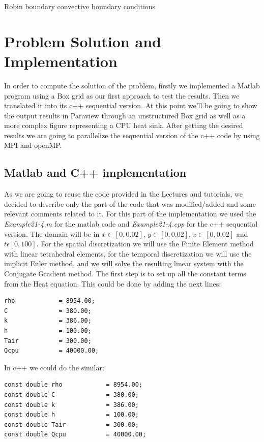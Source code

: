 \documentclass[12pt]{article}
\begin{document}
Robin boundary convective boundary conditions

\section{Problem Solution and Implementation}

In order to compute the solution of the problem, firstly we implemented a Matlab program using a Box grid as our first approach to test the results. Then we translated it into its c++ sequential version. At this point we'll be going to show the output results in Paraview through an unstructured Box grid as well as a more complex figure representing a CPU heat sink. After getting the desired results we are going to parallelize the sequential version of the c++ code by using MPI and openMP.

\subsection{Matlab and C++ implementation}
As we are going to reuse the code provided in the Lectures and tutorials, we decided to describe only the part of the code that was modified/added and some relevant comments related to it. For this part of the implementation we used the \textit{Example21-4.m} for the matlab code and \textit{Example21-4.cpp} for the c++ sequential version. The domain will be in $x\in[0,0.02]$, $y\in[0,0.02]$, $z\in[0,0.02]$ and $t\epsilon[0,100]$. For the spatial discretization we will use the Finite Element method with linear tetrahedral elements, for the temporal discretization we will use the implicit Euler method, and we will solve the resulting linear system with the Conjugate Gradient method. The first step is to set up all the constant terms from the Heat equation. This could be done by adding the next lines:

\begin{lstlisting}
rho            = 8954.00;
C              = 380.00;
k              = 386.00;
h              = 100.00;
Tair           = 300.00;
Qcpu           = 40000.00;
\end{lstlisting}

In c++ we could do the similar:

\begin{lstlisting}[style=MyC++Style]
const double rho            = 8954.00;
const double C              = 380.00;
const double k              = 386.00;
const double h              = 100.00;
const double Tair           = 300.00;
const double Qcpu           = 40000.00;
\end{lstlisting}
\end{document}
